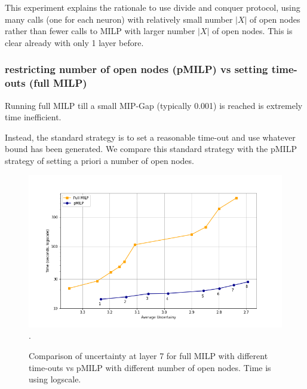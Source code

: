 This experiment explains the rationale to use divide and conquer protocol, using many calls
(one for each neuron) with relatively small number $|X|$ of open nodes rather than fewer calls to MILP with larger number $|X|$ of open nodes. This is clear already with only 1 layer before.

\fi
	



\subsubsection*{restricting number of open nodes (pMILP) vs setting time-outs (full MILP)}	

Running full MILP till a small MIP-Gap (typically 0.001) is reached is extremely time inefficient.

Instead, the standard strategy is to set a reasonable time-out and use whatever bound has been generated. We compare this standard strategy with the pMILP strategy of setting a priori a number of open nodes.


\begin{figure}[h!]\hspace*{-0.8cm}
	\includegraphics[scale=0.6]{Layer7_comparison.png}.
	\caption{Comparison of uncertainty at layer 7 for full MILP with different time-outs vs pMILP with different number of open nodes. Time is using logscale.}
	\label{fig4}
\end{figure}



